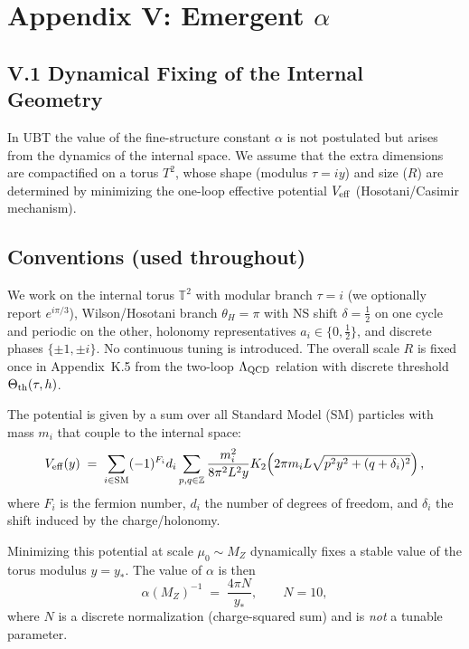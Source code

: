 
\appendix
\section*{Appendix V: Emergent $\alpha$}

\subsection*{V.1 Dynamical Fixing of the Internal Geometry}
In UBT the value of the fine-structure constant $\alpha$ is not postulated but arises from the dynamics of the internal space. 
We assume that the extra dimensions are compactified on a torus $T^2$, whose shape (modulus $\tau=i y$) and size ($R$) are determined by minimizing the one-loop effective potential $V_{\rm eff}$ (Hosotani/Casimir mechanism).

\subsection*{Conventions (used throughout)}\label{appV:conventions}
We work on the internal torus $\mathbb{T}^2$ with modular branch $\tau=i$ (we optionally report $e^{i\pi/3}$), Wilson/Hosotani branch $\theta_H=\pi$ with NS shift $\delta=\tfrac12$ on one cycle and periodic on the other, holonomy representatives $a_i\in\{0,\tfrac12\}$, and discrete phases $\{\pm1,\pm i\}$. No continuous tuning is introduced. The overall scale $R$ is fixed once in Appendix~K.5 from the two-loop $\Lambda_{\rm QCD}$ relation with discrete threshold $\Theta_{\rm th}(\tau,h)$.




The potential is given by a sum over all Standard Model (SM) particles with mass $m_i$ that couple to the internal space:
\begin{equation}
V_{\rm eff}(y) \;=\; \sum_{i \in \text{SM}} (-1)^{F_i} d_i 
  \sum_{p,q \in \mathbb{Z}} \frac{m_i^2}{8\pi^2 L^2 y} 
  K_2\!\left(2\pi m_i L \sqrt{p^2 y^2 + (q+\delta_i)^2}\right),
\end{equation}
where $F_i$ is the fermion number, $d_i$ the number of degrees of freedom, and $\delta_i$ the shift induced by the charge/holonomy.

Minimizing this potential at scale $\mu_0\sim M_Z$ dynamically fixes a stable value of the torus modulus $y=y_\ast$. The value of $\alpha$ is then
\begin{equation}
\alpha(M_Z)^{-1} \;=\; \frac{4\pi N}{y_\ast}, \qquad N=10,
\end{equation}
where $N$ is a discrete normalization (charge-squared sum) and is \emph{not} a tunable parameter.

